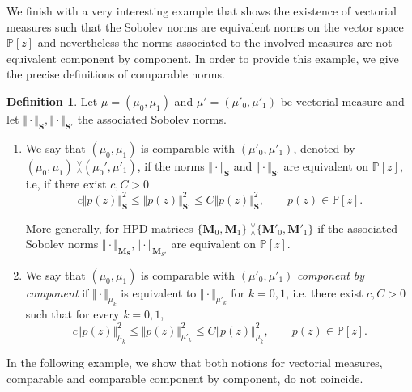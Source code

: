 \documentclass[12pt]{amsart}
\theoremstyle{definition}
\newtheorem{definition}{Definition}
\theoremstyle{plain}
\theoremstyle{remark}
\begin{document}
\noindent We finish with a very interesting example that shows the existence of vectorial measures such that the Sobolev norms are equivalent norms on the vector space $\mathbb{P}[z]$ and nevertheless the norms associated to the involved measures are not equivalent component by component. In order to provide this example, we give the precise definitions of comparable norms.

\begin{definition} Let $\mu=(\mu_0,\mu_1)$  and $\mu'=(\mu'_0,\mu'_1)$ be  vectorial measure and let  $\Vert \cdot \Vert_{\mathbf{S}}, \Vert \cdot \Vert_{\mathbf{S'}}$ the associated Sobolev norms. 
\begin{enumerate}
 \item  We say that  $(\mu_0,\mu_1)$ is comparable with $(\mu'_0,\mu'_1)$, denoted by $(\mu_0,\mu_1) \;{}^{\vee}_{\wedge} (\mu_0',\mu'_1)$, if the norms  $\Vert \cdot \Vert_{\mathbf{S}}$ and $\Vert \cdot \Vert_{\mathbf{S'}}$ are equivalent on $\mathbb{P}[z]$, i.e, 
 if there exist  $c,C>0$  
 $$
 c\Vert p(z) \Vert^{2}_{\mathbf{S}} \leq \Vert p(z) \Vert^{2}_{\mathbf{S'}} \leq C\Vert p(z) \Vert^{2}_{\mathbf{S}}, \qquad p(z) \in \mathbb{P}[z]. 
 $$

 \noindent More generally, for HPD matrices $\{\mathbf{M}_0,\mathbf{M}_1\} \;{}^{\vee}_{\wedge} \{\mathbf{M}'_{0},\mathbf{M}'_1\}$ if the associated Sobolev norms $\Vert \cdot \Vert_{\mathbf{M_{S}}}, \Vert \cdot \Vert_{\mathbf{M}_{S'}}$ are equivalent on $\mathbb{P}[z]$.
 \item  We say that $(\mu_0,\mu_1)$ is comparable with $(\mu'_0,\mu'_1)$ {\it component by component}  if $\Vert \cdot \Vert_{\mu_k}$ is equivalent to $\Vert \cdot \Vert_{\mu'_k}$ for $k=0,1$, i.e. there exist $c,C>0$ such that for every  $k=0,1$, 
$$
c \Vert p(z) \Vert^{2}_{\mu_k} \leq \Vert p(z) \Vert^{2}_{\mu'_k} \leq C\Vert p(z) \Vert^{2}_{\mu_k}, \qquad p(z) \in \mathbb{P}[z].
$$
\end{enumerate}
\end{definition}

\noindent In the following example, we show that both notions for vectorial measures, comparable and comparable component by component, do not coincide.  
\end{document}
